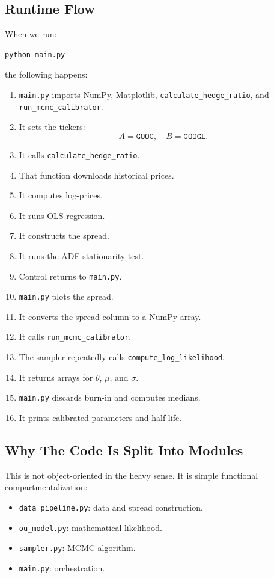 \documentclass[11pt]{article}
\newcommand{\code}[1]{\texttt{#1}}
\begin{document}
\subsection{Runtime Flow}

When we run:

\begin{lstlisting}[style=pythonstyle]
python main.py
\end{lstlisting}

the following happens:

\begin{enumerate}
  \item \code{main.py} imports NumPy, Matplotlib, \code{calculate\_hedge\_ratio},
  and \code{run\_mcmc\_calibrator}.
  \item It sets the tickers:
  \[
  A = \texttt{GOOG}, \quad B = \texttt{GOOGL}.
  \]
  \item It calls \code{calculate\_hedge\_ratio}.
  \item That function downloads historical prices.
  \item It computes log-prices.
  \item It runs OLS regression.
  \item It constructs the spread.
  \item It runs the ADF stationarity test.
  \item Control returns to \code{main.py}.
  \item \code{main.py} plots the spread.
  \item It converts the spread column to a NumPy array.
  \item It calls \code{run\_mcmc\_calibrator}.
  \item The sampler repeatedly calls \code{compute\_log\_likelihood}.
  \item It returns arrays for $\theta$, $\mu$, and $\sigma$.
  \item \code{main.py} discards burn-in and computes medians.
  \item It prints calibrated parameters and half-life.
\end{enumerate}

\subsection{Why The Code Is Split Into Modules}

This is not object-oriented in the heavy sense. It is simple functional
compartmentalization:

\begin{itemize}
  \item \code{data\_pipeline.py}: data and spread construction.
  \item \code{ou\_model.py}: mathematical likelihood.
  \item \code{sampler.py}: MCMC algorithm.
  \item \code{main.py}: orchestration.
\end{itemize}
\end{document}
